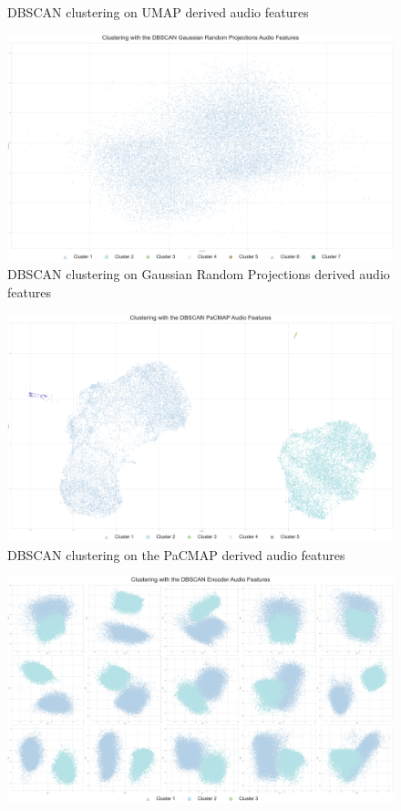 \begin{appendix}
\begin{figure}
    \caption{DBSCAN clustering on UMAP derived audio features}
    \label{fig:dbscan-third}
\end{figure}
\begin{figure}
    \centering
    \includegraphics[scale=0.08]{Outputs/DBSCAN Clustering - Gaussian Random Projections Audio Features.png}
    \caption{DBSCAN clustering on Gaussian Random Projections derived audio features}
    \label{fig:dbscan-fourth}
\end{figure}
\begin{figure}
    \centering
    \includegraphics[scale=0.09]{Outputs/DBSCAN Clustering - PaCMAP Audio Features.png}
    \caption{DBSCAN clustering on the PaCMAP derived audio features}
    \label{fig:dbscan-fifth}
\end{figure}
\begin{figure}
    \centering
    \includegraphics[scale=0.09]{Outputs/DBSCAN Clustering - Autoencoder Audio Features.png}

\end{figure}
\end{appendix}
